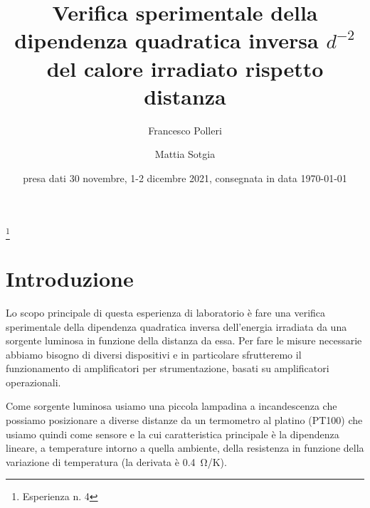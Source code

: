 \documentclass[
    rmp,
    reprint, 
    superscriptaddress, 
    altaffilletter, 
    amsmath, 
    amssymb,
    a4paper]{revtex4-2}
\begin{document}
\title{Verifica sperimentale della dipendenza quadratica inversa $d^{-2}$ del calore irradiato rispetto distanza 
}
\thanks{Esperienza n. 4
}

\author{Francesco Polleri}
\author{Mattia Sotgia}


\date{presa dati
    30 novembre, 1-2 dicembre 2021, consegnata in data 
    \today
}

\begin{abstract}
    
\end{abstract}
\maketitle
\thispagestyle{fancy}


\section*{Introduzione}
Lo scopo principale di questa esperienza di laboratorio è fare una verifica sperimentale della dipendenza quadratica inversa dell'energia irradiata da una sorgente luminosa in funzione della distanza da essa.
Per fare le misure necessarie abbiamo bisogno di diversi dispositivi e in particolare sfrutteremo il funzionamento di amplificatori per strumentazione, basati su amplificatori operazionali.

Come sorgente luminosa usiamo una piccola lampadina a incandescenza che possiamo posizionare a diverse distanze da un termometro al platino (PT100) che usiamo quindi come sensore e la cui caratteristica principale è la dipendenza lineare, a temperature intorno a quella ambiente, della resistenza in funzione della variazione di temperatura (la derivata è \SI{0.4}{\ohm/\kelvin}). 

\end{document}
